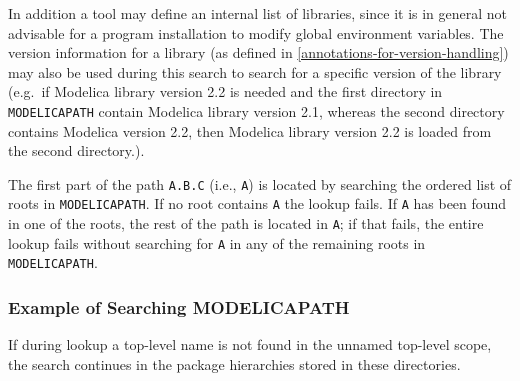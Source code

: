 In addition a tool may define an internal list of libraries, since it is
in general not advisable for a program installation to modify global
environment variables. The version information for a library (as defined
in \cref{annotations-for-version-handling}) may also be used during this search to search for a
specific version of the library (e.g.\ if Modelica library version 2.2 is
needed and the first directory in \lstinline!MODELICAPATH! contain Modelica library
version 2.1, whereas the second directory contains Modelica version 2.2,
then Modelica library version 2.2 is loaded from the second directory.).

\begin{nonnormative}
The first part of the path \lstinline!A.B.C! (i.e., \lstinline!A!) is located by searching the ordered list of roots in \lstinline!MODELICAPATH!.  If no root contains
\lstinline!A! the lookup fails.  If \lstinline!A! has been found in one of the roots, the rest of the path is located in \lstinline!A!; if that fails, the entire lookup
fails without searching for \lstinline!A! in any of the remaining roots in \lstinline!MODELICAPATH!.
\end{nonnormative}

\subsubsection{Example of Searching MODELICAPATH}\label{example-of-searching-modelicapath}

If during lookup a top-level name is not found in the unnamed top-level
scope, the search continues in the package hierarchies stored in these
directories.

